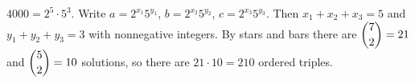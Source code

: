 $4000=2^5\cdot5^3$. Write $a=2^{x_1}5^{y_1}$, $b=2^{x_2}5^{y_2}$, $c=2^{x_3}5^{y_3}$. Then $x_1+x_2+x_3=5$ and $y_1+y_2+y_3=3$ with nonnegative integers. By stars and bars there are $\dbinom72=21$ and $\dbinom52=10$ solutions, so there are $21\cdot10=\boxed{210}$ ordered triples.
